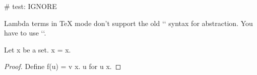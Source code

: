 # test: IGNORE

Lambda terms in TeX mode don't support the old `\x` syntax for abstraction.
You have to use `\fun`.

\begin{forthel}
  \begin{lemma}
    Let x be a set. x = x.
  \end{lemma}
  \begin{proof}
    Define f(u) = \fun v \in x. u for u \in x.
  \end{proof}
\end{forthel}

